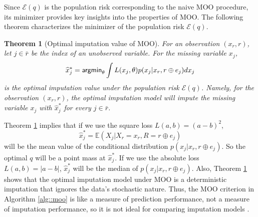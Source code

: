 \documentclass[aos, preprint]{imsart}
\theoremstyle{plain}
\newtheorem{theorem}{Theorem}[section]
\theoremstyle{definition}
\let\hat\widehat
\newcommand{\E}{\mbox{$\mathbb{E}$}}
\begin{document}
Since $\mathcal{E}(q)$ is  the population risk corresponding to the naive MOO procedure, its minimizer provides key insights into the properties of MOO. The following theorem characterizes the minimizer of the population risk $\mathcal{E}(q)$.





\begin{theorem}[Optimal imputation value of MOO]
\label{thm::moo}
For an observation $(x_r,r)$, let $j \in \bar r$ be the index of an unobserved variable. 
For the missing variable $x_j$, 
\begin{equation}
\hat x^*_j = {\sf argmin}_{\theta} \int L( x_j,\theta ) p(x_j|x_{r}, r\oplus e_j)dx_j
\label{eq::opt::value}
\end{equation}
is the optimal imputation value under the population risk $\mathcal{E}(q)$.
Namely, for the observation $(x_r,r)$, the optimal imputation model will impute
the missing variable $x_j$ with $\hat x^*_j$ for every $j\in \bar r$.
\end{theorem}

Theorem \ref{thm::moo} implies that
if we use the square loss $L(a,b) = (a-b)^2$,
$$
\hat x^*_j = \E(X_j|X_r = x_r, R = r\oplus e_j)
$$
will be the mean value of the conditional distribution $p(x_j|x_r, r\oplus e_j)$.
So the optimal $q$ will be a point mass at $\hat x^*_j$.
If we use the absolute loss $L(a,b) = |a-b|$,
$\hat x^*_j $ will be the median of $p(x_j|x_r, r\oplus e_j)$.
Also, Theorem \ref{thm::moo} shows that the optimal imputation model under MOO
is a deterministic imputation that ignores the data's stochastic nature.
Thus, the  MOO criterion in Algorithm \ref{alg::moo} is like
a measure of prediction performance, not  a measure of imputation performance, so it is not ideal for comparing
imputation models \citep{van2018flexible,naf2023imputation, grzesiak2025needdozensmethodsreal}.
\end{document}
